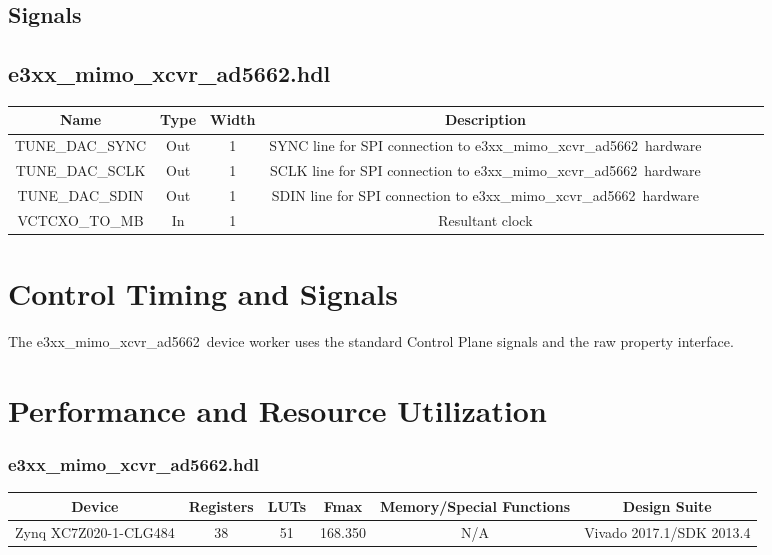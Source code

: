 \documentclass{article}
\def\comp{e3xx\_mimo\_xcvr\_ad5662}
\begin{document}
\begin{landscape}
\section*{Signals}
	\subsection*{\comp.hdl}
	\begin{scriptsize}
			\begin{tabular}{|c|c|c|c|p{2.6cm}|c|c|c|}
			\hline
			\rowcolor{blue}
			Name & Type  & Width & Description \\
			\hline
			TUNE\_DAC\_SYNC  & Out & 1     & SYNC line for SPI connection to \comp\ hardware    \\
			\hline
			TUNE\_DAC\_SCLK  & Out & 1     & SCLK line for SPI connection to \comp\ hardware    \\
			\hline
			TUNE\_DAC\_SDIN  & Out & 1     & SDIN line for SPI connection to \comp\ hardware    \\
			\hline
			VCTCXO\_TO\_MB  & In & 1     & Resultant clock    \\
			\hline
		\end{tabular}
	\end{scriptsize}
\end{landscape}

\section*{Control Timing and Signals}
The \comp\ device worker uses the standard Control Plane signals and the raw property interface.

\section*{Performance and Resource Utilization}
\subsubsection*{\comp.hdl}
\begin{scriptsize}
	\begin{tabular}{|c|c|c|c|c|c|}
		\hline
		\rowcolor{blue}
		Device             & Registers & LUTs & Fmax        & Memory/Special Functions & Design Suite \\
		\hline
		Zynq XC7Z020-1-CLG484 & 38      & 51  & 168.350 & N/A                         & Vivado 2017.1/SDK 2013.4    \\
		\hline
	\end{tabular}
\end{scriptsize}
\end{document}
